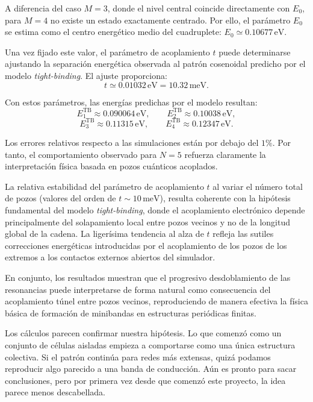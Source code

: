 \documentclass[a4paper,12pt]{article}
\begin{document}
A diferencia del caso $M=3$, donde el nivel central coincide directamente con $E_0$, para $M=4$ no existe un estado exactamente centrado. Por ello, el parámetro $E_0$ se estima como el centro energético medio del cuadruplete: $E_0 \simeq 0.10677\,\mathrm{eV}$.

Una vez fijado este valor, el parámetro de acoplamiento $t$ puede determinarse ajustando la separación energética observada al patrón cosenoidal predicho por el modelo \textit{tight-binding}. El ajuste proporciona:
\[
t\simeq 0.01032\,\mathrm{eV}=10.32\,\mathrm{meV}.
\]

Con estos parámetros, las energías predichas por el modelo resultan:
\[
E_1^{\mathrm{TB}}\approx 0.090064\,\mathrm{eV},
\qquad
E_2^{\mathrm{TB}}\approx 0.10038\,\mathrm{eV},
\]
\[
E_3^{\mathrm{TB}}\approx 0.11315\,\mathrm{eV},
\qquad
E_4^{\mathrm{TB}}\approx 0.12347\,\mathrm{eV}.
\]

Los errores relativos respecto a las simulaciones están por debajo del $1\%$. Por tanto, el comportamiento observado para $N=5$ refuerza claramente la interpretación física basada en pozos cuánticos acoplados.

La relativa estabilidad del parámetro de acoplamiento $t$ al variar el número total de pozos (valores del orden de $t\sim 10\,\mathrm{meV}$), resulta coherente con la hipótesis fundamental del modelo \textit{tight-binding}, donde el acoplamiento electrónico depende principalmente del solapamiento local entre pozos vecinos y no de la longitud global de la cadena. La ligerísima tendencia al alza de $t$ refleja las sutiles correcciones energéticas introducidas por el acoplamiento de los pozos de los extremos a los contactos externos abiertos del simulador.

En conjunto, los resultados muestran que el progresivo desdoblamiento de las resonancias puede interpretarse de forma natural como consecuencia del acoplamiento túnel entre pozos vecinos, reproduciendo de manera efectiva la física básica de formación de minibandas en estructuras periódicas finitas.

Los cálculos parecen confirmar nuestra hipótesis. Lo que comenzó como un conjunto de células aisladas empieza a comportarse como una única estructura colectiva. Si el patrón continúa para redes más extensas, quizá podamos reproducir algo parecido a una banda de conducción. Aún es pronto para sacar conclusiones, pero por primera vez desde que comenzó este proyecto, la idea parece menos descabellada.
\end{document}
